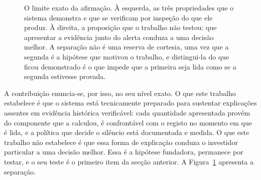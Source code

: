 \begin{figure}[!htbp]
\centering
{}
\caption[A fronteira daquilo que o trabalho estabelece]{O limite exato da afirmação. À esquerda,
as três propriedades que o sistema demonstra e que se verificam por inspeção do que ele produz. À
direita, a proposição que o trabalho não testou: que apresentar a evidência junto do alerta
conduza a uma decisão melhor. A separação não é uma reserva de cortesia, uma vez que a segunda é
a hipótese que motivou o trabalho, e distingui-la do que ficou demonstrado é o que impede que a
primeira seja lida como se a segunda estivesse provada.}
\label{fig:con_fronteira}
\end{figure}

A contribuição enuncia-se, por isso, no seu nível exato. O que este trabalho estabelece é que
o sistema está tecnicamente preparado para sustentar explicações assentes em evidência histórica
verificável: cada quantidade apresentada provém do componente que a calculou, é confrontável com o
registo no momento em que é lida, e a política que decide o silêncio está documentada e medida. O
que este trabalho não estabelece é que essa forma de explicação conduza o investidor particular a
uma decisão melhor. Essa é a hipótese fundadora, permanece por testar, e o seu teste é o primeiro
item da secção anterior. A Figura~\ref{fig:con_fronteira}
apresenta a separação.
